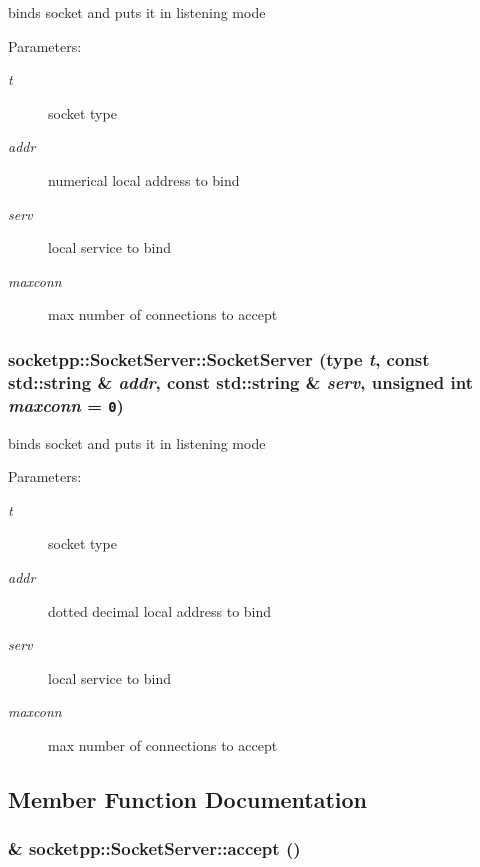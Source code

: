 binds socket and puts it in listening mode 

\begin{Desc}
\item[Parameters:]
\begin{description}
\item[{\em t}]socket type \item[{\em addr}]numerical local address to bind \item[{\em serv}]local service to bind \item[{\em maxconn}]max number of connections to accept \end{description}
\end{Desc}
\hypertarget{classsocketpp_1_1SocketServer_ed1844f6c0c6e9e3b69e69903355d171}{
\subsubsection[{SocketServer}]{\setlength{\rightskip}{0pt plus 5cm}socketpp::SocketServer::SocketServer (type {\em t}, \/  const std::string \& {\em addr}, \/  const std::string \& {\em serv}, \/  unsigned int {\em maxconn} = {\tt 0})}}
\label{classsocketpp_1_1SocketServer_ed1844f6c0c6e9e3b69e69903355d171}


binds socket and puts it in listening mode 

\begin{Desc}
\item[Parameters:]
\begin{description}
\item[{\em t}]socket type \item[{\em addr}]dotted decimal local address to bind \item[{\em serv}]local service to bind \item[{\em maxconn}]max number of connections to accept \end{description}
\end{Desc}


\subsection{Member Function Documentation}
\hypertarget{classsocketpp_1_1SocketServer_de24bd723d353d62d034718a1d95c02f}{
\subsubsection[{accept}]{ \& socketpp::SocketServer::accept ()}}
\label{classsocketpp_1_1SocketServer_de24bd723d353d62d034718a1d95c02f}


